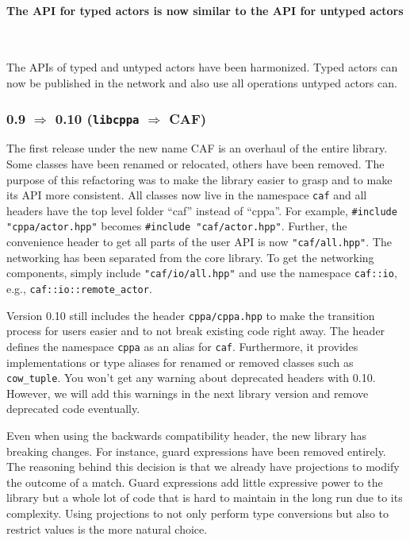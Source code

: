 \paragraph{The API for typed actors is now similar to the API for untyped actors}

~

The APIs of typed and untyped actors have been harmonized.
Typed actors can now be published in the network and also use all operations untyped actors can.

\clearpage
\subsubsection{0.9 $\Rightarrow$ 0.10 (\texttt{libcppa} $\Rightarrow$ CAF)}

The first release under the new name CAF is an overhaul of the entire library.
Some classes have been renamed or relocated, others have been removed.
The purpose of this refactoring was to make the library easier to grasp and to make its API more consistent.
All classes now live in the namespace \lstinline^caf^ and all headers have the top level folder ``caf'' instead of ``cppa''.
For example, \lstinline^#include "cppa/actor.hpp"^ becomes \lstinline^#include "caf/actor.hpp"^.
Further, the convenience header to get all parts of the user API is now \lstinline^"caf/all.hpp"^.
The networking has been separated from the core library.
To get the networking components, simply include \lstinline^"caf/io/all.hpp"^ and use the namespace \lstinline^caf::io^, e.g., \lstinline^caf::io::remote_actor^.

Version 0.10 still includes the header \lstinline^cppa/cppa.hpp^ to make the transition process for users easier and to not break existing code right away.
The header defines the namespace \lstinline^cppa^ as an alias for \lstinline^caf^.
Furthermore, it provides implementations or type aliases for renamed or removed classes such as \lstinline^cow_tuple^.
You won't get any warning about deprecated headers with 0.10.
However, we will add this warnings in the next library version and remove deprecated code eventually.

Even when using the backwards compatibility header, the new library has breaking changes.
For instance, guard expressions have been removed entirely.
The reasoning behind this decision is that we already have projections to modify the outcome of a match.
Guard expressions add little expressive power to the library but a whole lot of code that is hard to maintain in the long run due to its complexity.
Using projections to not only perform type conversions but also to restrict values is the more natural choice.

